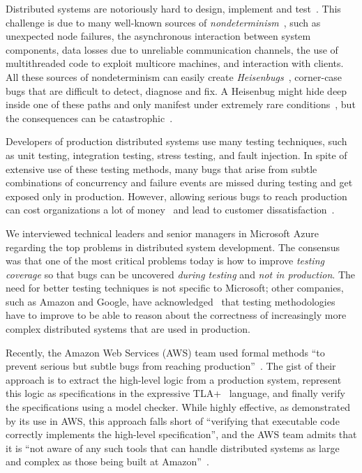 Distributed systems are notoriously hard to design, implement and test~\cite{cavage2013there, leesatapornwongsa2014samc, laguna2015debugging, maddox2015test}. This challenge is due to many well-known sources of \emph{nondeterminism}~\cite{chandra2007paxos, henry2009cloud}, such as unexpected node failures, the asynchronous interaction between system components, data losses due to unreliable communication channels, the use of multithreaded code to exploit multicore machines, and interaction with clients. All these sources of nondeterminism can easily create \emph{Heisenbugs}~\cite{gray1986computers, musuvathi2008finding}, corner-case bugs that are difficult to detect, diagnose and fix. A Heisenbug might hide deep inside one of these paths and only manifest under extremely rare conditions~\cite{gray1986computers, musuvathi2008finding}, but the consequences can be catastrophic~\cite{amazon2012aws, google2014outage}.

Developers of production distributed systems use many testing techniques, such as unit testing, integration testing, stress testing, and fault injection. In spite of extensive use of these testing methods, many bugs that arise from subtle combinations of concurrency and failure events are missed during testing and get exposed only in production. However, allowing serious bugs to reach production can cost organizations a lot of money~\cite{tassey2002economic} and lead to customer dissatisfaction~\cite{amazon2012aws, google2014outage}.

We interviewed technical leaders and senior managers in Microsoft Azure regarding the top problems in distributed system development. The consensus was that one of the most critical problems today is how to improve \emph{testing coverage} so that bugs can be uncovered \emph{during testing} and \emph{not in production}. The need for better testing techniques is not specific to Microsoft; other companies, such as Amazon and Google, have acknowledged~\cite{chandra2007paxos,newcombe2015aws} that testing methodologies have to improve to be able to reason about the correctness of increasingly more complex distributed systems that are used in production.

Recently, the Amazon Web Services (AWS) team used formal methods ``to prevent serious but subtle bugs from reaching production''~\cite{newcombe2015aws}. The gist of their approach is to extract the high-level logic from a production system, represent this logic as specifications in the expressive TLA+~\cite{lamport1994temporal} language, and finally verify the specifications using a model checker. While highly effective, as demonstrated by its use in AWS, this approach falls short of ``verifying that executable code correctly implements the high-level specification'', and the AWS team admits that it is ``not aware of any such tools that can handle distributed systems as large and complex as those being built at Amazon''~\cite{newcombe2015aws}.

